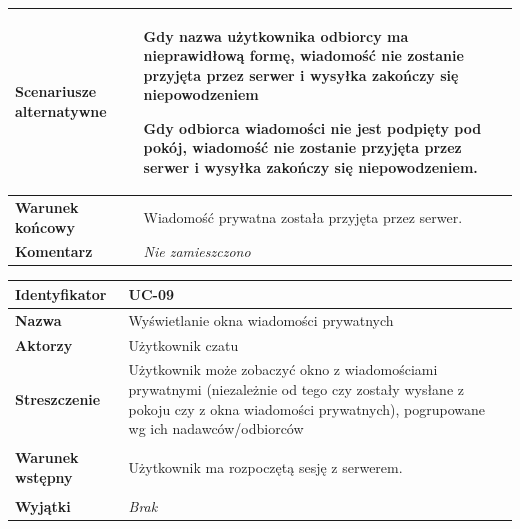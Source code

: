{\begin{tabular}{ | l | l | }
	\hline
		\textbf{Scenariusze alternatywne} & \parbox[t]
		{11cm}{
			\begin{enumreq}
				\item Gdy nazwa użytkownika odbiorcy ma nieprawidłową formę, wiadomość
				nie zostanie przyjęta przez serwer i wysyłka zakończy się niepowodzeniem
				\item Gdy odbiorca wiadomości nie jest podpięty pod pokój, wiadomość nie
				zostanie przyjęta przez serwer i wysyłka zakończy się niepowodzeniem.
			\end{enumreq}
		}
		\\

	\hline
		\textbf{Warunek końcowy} & \parbox[t]{11cm}{
			Wiadomość prywatna została przyjęta przez serwer.
		}
		\\

	\hline
		\textbf{Komentarz} & \parbox[t]{11cm}{
			\textit{Nie zamieszczono}
		}
		\\

	\hline
\end{tabular}

\vspace{2em}

\begin{tabular}{ | l | l | }
	\hline
		\textbf{Identyfikator} &
		UC-09
		\\

	\hline
		\textbf{Nazwa} &
		Wyświetlanie okna wiadomości prywatnych
		\\

	\hline
		\textbf{Aktorzy} & \parbox[t]{11cm}{
			Użytkownik czatu
		}\\

	\hline
		\textbf{Streszczenie} & \parbox[t]{11cm}{
			Użytkownik może zobaczyć okno z wiadomościami prywatnymi (niezależnie od
			tego czy zostały wysłane z pokoju czy z okna wiadomości prywatnych),
			pogrupowane wg ich nadawców/odbiorców
		}\\

	\hline
		\textbf{Warunek wstępny} & \parbox[t]{11cm}{
			\begin{enumreq}
				\item Użytkownik ma rozpoczętą sesję z serwerem.
			\end{enumreq}

		}
		\\

	\hline
		\textbf{Wyjątki} & \parbox[t]{11cm}{
			\textit{Brak}

		}
		\\


\end{tabular}}
